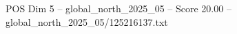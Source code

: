 \begin{textsample}{POS Dim 5 – global\_north\_2025\_05 – Score 20.00 – global\_north\_2025\_05/125216137.txt}
\end{textsample}
